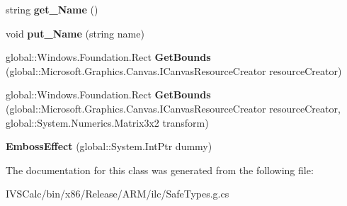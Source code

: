 \begin{DoxyCompactItemize}
string {\bfseries get\+\_\+\+Name} ()
\item 
\mbox{\label{class_microsoft_1_1_graphics_1_1_canvas_1_1_effects_1_1_emboss_effect_aac93b1de59ca4b3073b40ad837bf6ee8}} 
void {\bfseries put\+\_\+\+Name} (string name)
\item 
\mbox{\label{class_microsoft_1_1_graphics_1_1_canvas_1_1_effects_1_1_emboss_effect_a447c5d2e98d82eee9645d76bf8645f44}} 
global\+::\+Windows.\+Foundation.\+Rect {\bfseries Get\+Bounds} (global\+::\+Microsoft.\+Graphics.\+Canvas.\+I\+Canvas\+Resource\+Creator resource\+Creator)
\item 
\mbox{\label{class_microsoft_1_1_graphics_1_1_canvas_1_1_effects_1_1_emboss_effect_a332e3f4203f0f5fc176b241c611be3b3}} 
global\+::\+Windows.\+Foundation.\+Rect {\bfseries Get\+Bounds} (global\+::\+Microsoft.\+Graphics.\+Canvas.\+I\+Canvas\+Resource\+Creator resource\+Creator, global\+::\+System.\+Numerics.\+Matrix3x2 transform)
\item 
\mbox{\label{class_microsoft_1_1_graphics_1_1_canvas_1_1_effects_1_1_emboss_effect_a2d3861da33bd9475d1e949275788def0}} 
{\bfseries Emboss\+Effect} (global\+::\+System.\+Int\+Ptr dummy)
\end{DoxyCompactItemize}


The documentation for this class was generated from the following file\+:\begin{DoxyCompactItemize}
\item 
I\+V\+S\+Calc/bin/x86/\+Release/\+A\+R\+M/ilc/Safe\+Types.\+g.\+cs\end{DoxyCompactItemize}
